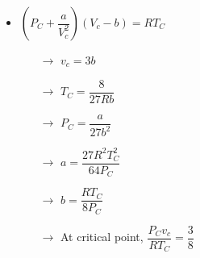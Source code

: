 \documentclass[8pt]{article}
\begin{document}
	\begin{itemize}
		\item $\boxed{\left(P_C+\dfrac{a}{V_c^2}\right)(V_c-b) = RT_C}$
			\begin{itemize}
				\item[$\rightarrow$] $v_c = 3b$
				\item[$\rightarrow$] $T_C = \dfrac{8}{27Rb}$
				\item[$\rightarrow$] $P_C = \dfrac{a}{27b^2}$
				\item[$\rightarrow$] $a = \dfrac{27R^2T_C^2}{64P_C}$
				\item[$\rightarrow$] $b = \dfrac{RT_C}{8P_C}$
				\item[$\rightarrow$] At critical point, $\dfrac{P_Cv_c}{RT_C} = \dfrac{3}{8}$
			\end{itemize}
	\end{itemize}
\hrulefill\\
\end{document}
